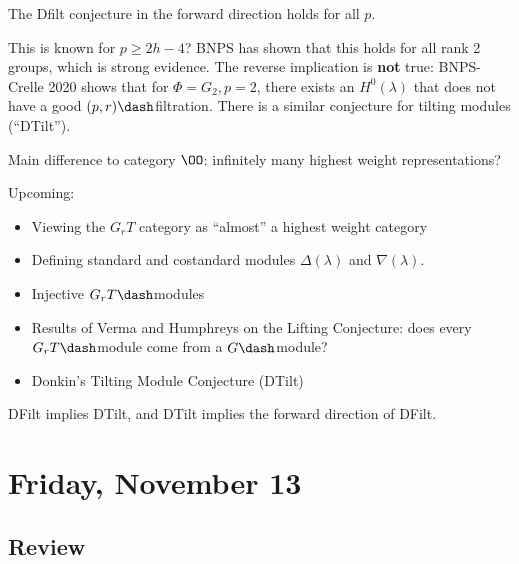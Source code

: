 \begin{proposition}[Conjecture]

The Dfilt conjecture in the forward direction holds for all \(p\).

\end{proposition}

\begin{remark}

This is known for \(p\geq 2h-4\)? BNPS has shown that this holds for all
rank 2 groups, which is strong evidence. The reverse implication is
\textbf{not} true: BNPS-Crelle 2020 shows that for \(\Phi = G_2, p=2\),
there exists an \(H^0(\lambda)\) that does not have a good
\((p, r)\dash\)filtration. There is a similar conjecture for tilting
modules (``DTilt'').

\end{remark}

Main difference to category \(\OO\): infinitely many highest weight
representations?

Upcoming:

\begin{itemize}
\tightlist
\item
  Viewing the \(G_r T\) category as ``almost'' a highest weight category
\item
  Defining standard and costandard modules \(\Delta(\lambda)\) and
  \(\nabla(\lambda)\).
\item
  Injective \(G_r T\dash\)modules
\item
  Results of Verma and Humphreys on the Lifting Conjecture: does every
  \(G_r T\dash\)module come from a \(G\dash\)module?
\item
  Donkin's Tilting Module Conjecture (DTilt)
\end{itemize}

\begin{proposition}

DFilt implies DTilt, and DTilt implies the forward direction of DFilt.

\end{proposition}

\hypertarget{friday-november-13}{%
\section{Friday, November 13}\label{friday-november-13}}

\hypertarget{review-3}{%
\subsection{Review}\label{review-3}}

